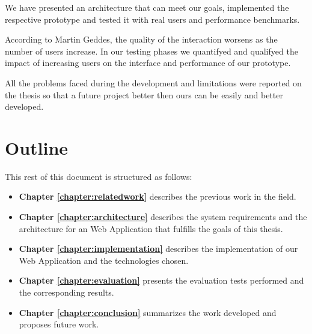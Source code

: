 	We have presented an architecture that can meet our goals, implemented the respective prototype and tested it with real users and performance benchmarks.

        
	According to Martin Geddes, the quality of the interaction worsens as the number of users increase\cite{geddes}. In our testing phases we quantifyed and qualifyed the impact of increasing users on the interface and performance of our prototype. 

	All the problems faced during the development and limitations were reported on the thesis so that a future project better then ours can be easily and better developed.


\section{Outline}

This rest of this document is structured as follows:

\begin{itemize}
\item \textbf{Chapter \ref{chapter:relatedwork}} describes the previous work in the field.
\item \textbf{Chapter \ref{chapter:architecture}} describes the system requirements and the architecture for an Web Application that fulfills the goals of this thesis.
\item \textbf{Chapter \ref{chapter:implementation}} describes the implementation of our Web Application and the technologies chosen.
\item \textbf{Chapter \ref{chapter:evaluation}} presents the evaluation tests performed and the corresponding results.
\item \textbf{Chapter \ref{chapter:conclusion}} summarizes the work developed and proposes future work.
\end{itemize}

\cleardoublepage
